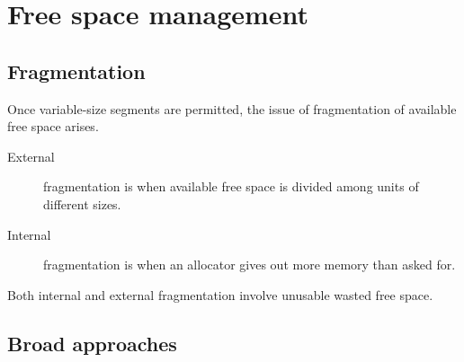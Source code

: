\chapter{Free space management}
\label{ch:free-space-management}




\section{Fragmentation}

Once variable-size segments are permitted, the issue of fragmentation of available free space arises.

\begin{description}
\item[External] fragmentation is when available free space is divided among units of different sizes.
\item[Internal] fragmentation is when an allocator gives out more memory than asked for.
\end{description}

Both internal and external fragmentation involve unusable wasted free space.

\section{Broad approaches}

